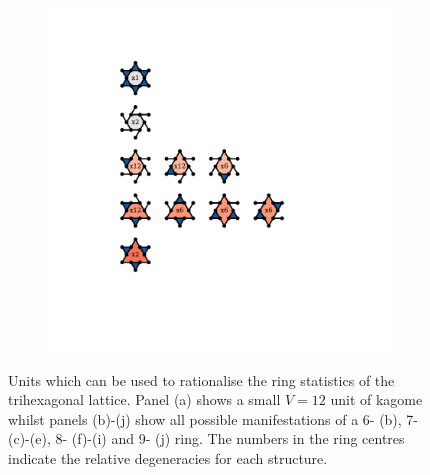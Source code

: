 \begin{figure}[bt]
\begin{subfigure}[b]{0.1\textwidth}
         \caption{}
         \label{fig:pro3pktrihex9}
     \end{subfigure}
     \hfill
     \begin{subfigure}[b]{0.1\textwidth}
         \centering
         \includegraphics[width=\textwidth]{./figures/procrystals/kagome9.pdf}
         \caption{}
         \label{fig:pro3pktrihex10}
     \end{subfigure}
     \hfill
    
     \caption{Units which can be used to rationalise the ring statistics of the trihexagonal lattice. Panel (a) shows a small $V=12$ unit of kagome whilst panels (b)\--(j) show all possible manifestations of a 6\-- (b), 7\-- (c)\--(e), 8\-- (f)\--(i) and 9\-- (j) ring. The numbers in the ring centres indicate the relative degeneracies for each structure.} 
     \label{fig:pro3pktrihex}
\end{figure}

